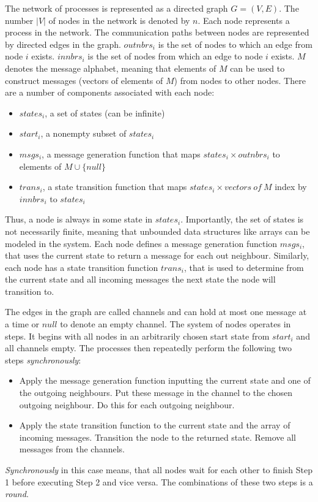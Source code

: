 \documentclass[fleqn]{article}
\begin{document}
The network of processes is represented as a directed graph $G=(V,E)$. The number $|V|$ of nodes in the network is denoted by $n$. Each node represents a process in the network.
The communication paths between nodes are represented by directed edges in the graph.
$outnbrs_i$ is the set of nodes to which an edge from node $i$ exists.
$innbrs_i$ is the set of nodes from which an edge to node $i$ exists.
$M$ denotes the message alphabet, meaning that elements of $M$ can be used to construct messages (vectors of elements of $M$) from nodes to other nodes.
There are a number of components associated with each node:
\begin{itemize}
    \item $states_i$, a set of states (can be infinite)
    \item $start_i$, a nonempty subset of $states_i$
    \item $msgs_i$, a message generation function that maps $states_i \times outnbrs_i$ to elements of $M \cup \{null\}$
    \item $trans_i$, a state transition function that maps $states_i \times vectors\ of\ M$ index by $innbrs_i$ to $states_i$
\end{itemize}
Thus, a node is always in some state in $states_i$. Importantly, the set of states is not necessarily finite, meaning that unbounded data structures like arrays can be modeled in the system.
Each node defines a message generation function $msgs_i$, that uses the current state to return a message for each out neighbour. Similarly, each node has a state transition function $trans_i$, that is used to determine
from the current state and all incoming messages the next state the node will transition to.

The edges in the graph are called channels and can hold at most one message at a time or $null$ to denote an empty channel.
The system of nodes operates in steps. It begins with all nodes in an arbitrarily chosen start state from $start_i$ and all channels empty.
The processes then repeatedly perform the following two steps \textit{synchronously}:
\begin{itemize}
  \item Apply the message generation function inputting the current state and one of the outgoing neighbours. Put these message in the channel to the chosen outgoing neighbour. Do this for each outgoing neighbour.
  \item Apply the state transition function to the current state and the array of incoming messages. Transition the node to the returned state. Remove all messages from the channels.
\end{itemize}
\textit{Synchronously} in this case means, that all nodes wait for each other to finish Step 1 before executing Step 2 and vice versa.
The combinations of these two steps is a \textit{round}.
\end{document}
